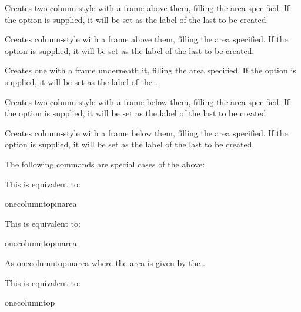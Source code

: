 \documentclass[fontsize=12pt]{scrbook}
\begin{document}
Creates two column-style  with a 
frame above them, filling the area specified. If the 
option is supplied, it will be set as the label of the last
 to be created.

Creates  column-style  with a   
frame above them, filling the area specified. If the 
option is supplied, it will be set as the label of the last
 to be created.

Creates one  with a  frame underneath it, 
filling the area specified. If the  option is supplied, it will
be set as the label of the .

Creates two column-style  with a  frame 
below them, filling the area specified. If the 
option is supplied, it will be set as the label of the last
 to be created.

Creates  column-style  with a  
frame below them, filling the area specified. If the 
option is supplied, it will be set as the label of the last
 to be created.

The following commands are special cases of the above:

This is equivalent to:
\begin{compactcodebox}
\gls{onecolumntopinarea}
\end{compactcodebox}

This is equivalent to:
\begin{compactcodebox}
\gls{onecolumntopinarea}
\end{compactcodebox}

As \gls{onecolumntopinarea} where the area is given by the
.

This is equivalent to: 
\begin{compactcodebox}
\gls{onecolumntop}
\end{compactcodebox}
\end{document}
